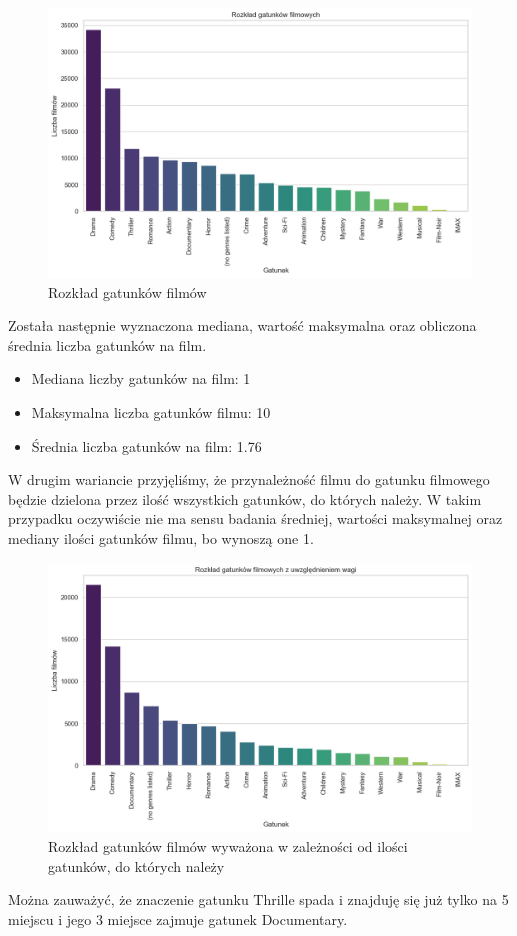 \documentclass{article}
\begin{document}
\begin{figure}[H]
\centering
\includegraphics[width=1\textwidth]{pictures/rozklad_gatunku_filmow.png}
\caption{Rozkład gatunków filmów}
\label{fig:rozklad_gatunkow}
\end{figure}
Została następnie wyznaczona mediana, wartość maksymalna oraz obliczona średnia liczba gatunków na film.
\begin{itemize}
    \item Mediana liczby gatunków na film: 1
    \item Maksymalna liczba gatunków filmu: 10
    \item Średnia liczba gatunków na film: 1.76
\end{itemize}
W drugim wariancie przyjęliśmy, że przynależność filmu do gatunku filmowego będzie dzielona przez ilość wszystkich gatunków, do których należy. W takim przypadku oczywiście nie ma sensu badania średniej, wartości maksymalnej oraz mediany ilości gatunków filmu, bo wynoszą one 1.
\begin{figure}[H]
\centering
\includegraphics[width=1\textwidth]{pictures/rozklad_gatunku_filmow_weighted.png}
\caption{Rozkład gatunków filmów wyważona w zależności od ilości gatunków, do których należy}
\label{fig:rozklad_gatunkow}
\end{figure}
Można zauważyć, że znaczenie gatunku Thrille spada i znajduję się już tylko na 5 miejscu i jego 3 miejsce zajmuje gatunek Documentary.
\end{document}
